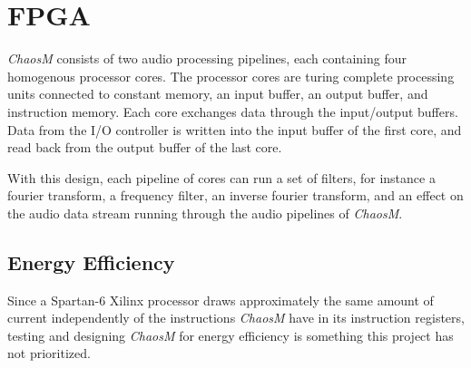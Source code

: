 \FloatBarrier
\section{FPGA}\label{chapter:fpga}

\textit{ChaosM} consists of two audio processing pipelines, each containing four
homogenous processor cores. The processor cores are turing complete processing
units connected to constant memory, an input buffer, an output buffer, and
instruction memory. Each core exchanges data through the input/output buffers.
Data from the I/O controller is written into the input buffer of the first core, and read
back from the output buffer of the last core.

With this design, each pipeline of cores can run a set of filters, for instance
a fourier transform, a frequency filter, an inverse fourier transform, and an
effect on the audio data stream running through the audio pipelines of \textit{ChaosM}.








\subsection{Energy Efficiency}
Since a Spartan-6 Xilinx processor draws approximately the same amount of current
independently of the instructions \textit{ChaosM} have in its instruction registers,
testing and designing \textit{ChaosM} for energy efficiency is something this project
has not prioritized.
